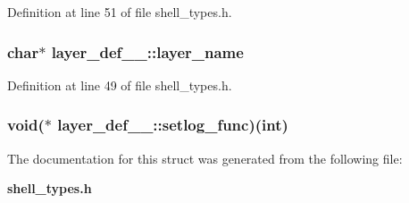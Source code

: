 Definition at line 51 of file shell\_\-types.h.
\subsubsection[{layer\_\-name}]{\setlength{\rightskip}{0pt plus 5cm}char$\ast$ {\bf layer\_\-def\_\-\_\-::layer\_\-name}}\label{structlayer__def_____e3ce826183c3bd6b126511808dd1e449}




Definition at line 49 of file shell\_\-types.h.
\subsubsection[{setlog\_\-func}]{\setlength{\rightskip}{0pt plus 5cm}void($\ast$ {\bf layer\_\-def\_\-\_\-::setlog\_\-func})(int)}\label{structlayer__def_____30ae5403c54841f30e5f22361c8b1ee5}




The documentation for this struct was generated from the following file:\begin{CompactItemize}
\item 
{\bf shell\_\-types.h}\end{CompactItemize}
